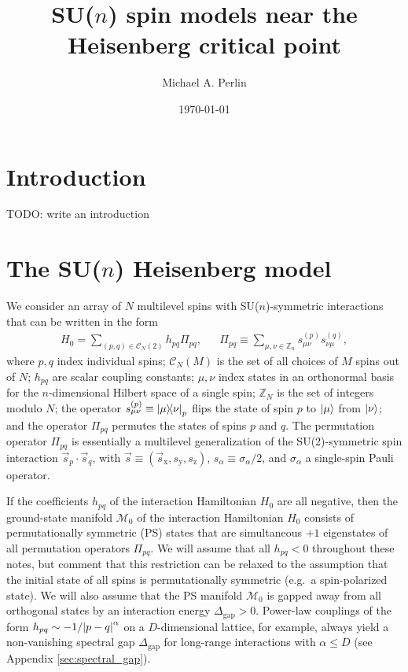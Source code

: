 \documentclass[nofootinbib,notitlepage,11pt]{revtex4-2}
\renewcommand{\t}{\text} %
\newcommand{\p}[1]{\left(#1\right)} %
\renewcommand{\c}{\cdot} %
\renewcommand{\v}{\vec} %
\newcommand{\1}{\mathds{1}}
\newcommand{\x}{\text{x}}
\newcommand{\y}{\text{y}}
\newcommand{\z}{\text{z}}
\newcommand{\C}{\mathcal{C}}
\newcommand{\M}{\mathcal{M}}
\newcommand{\ZZ}{\mathbb{Z}}
\newcommand{\red}[1]{{\color{red} #1}}
\begin{document}
\title{SU($n$) spin models near the Heisenberg critical point}%
\author{Michael A. Perlin}%
\date{\today}

\maketitle

\tableofcontents

\section{Introduction}

\red{TODO: write an introduction}

\section{The SU($n$) Heisenberg model}

We consider an array of $N$ multilevel spins with SU($n$)-symmetric
interactions that can be written in the form
\begin{align}
  H_0 = \sum_{\p{p,q}\in\C_N\p{2}} h_{pq} \Pi_{pq},
  &&
  \Pi_{pq} \equiv \sum_{\mu,\nu\in\ZZ_n} s_{\mu\nu}^{(p)} s_{\nu\mu}^{(q)},
  \label{eq:H_0}
\end{align}
where $p,q$ index individual spins; $\C_N\p{M}$ is the set of all
choices of $M$ spins out of $N$; $h_{pq}$ are scalar coupling
constants; $\mu,\nu$ index states in an orthonormal basis for the
$n$-dimensional Hilbert space of a single spin; $\ZZ_N$ is the set of
integers modulo $N$; the operator
$s_{\mu\nu}^{(p)}\equiv\op{\mu}{\nu}_p$ flips the state of spin $p$ to
$\ket\mu$ from $\ket\nu$; and the operator $\Pi_{pq}$ permutes the
states of spins $p$ and $q$.  The permutation operator $\Pi_{pq}$ is
essentially a multilevel generalization of the SU(2)-symmetric spin
interaction $\v s_p\c\v s_q$, with $\v s\equiv\p{\v s_\x,s_\y,s_\z}$,
$s_\alpha\equiv\sigma_\alpha/2$, and $\sigma_\alpha$ a single-spin
Pauli operator.

If the coefficients $h_{pq}$ of the interaction Hamiltonian $H_0$ are
all negative, then the ground-state manifold $\M_0$ of the interaction
Hamiltonian $H_0$ consists of permutationally symmetric (PS) states
that are simultaneous $+1$ eigenstates of all permutation operators
$\Pi_{pq}$.  We will assume that all $h_{pq}<0$ throughout these
notes, but comment that this restriction can be relaxed to the
assumption that the initial state of all spins is permutationally
symmetric (e.g.~a spin-polarized state).  We will also assume that the
PS manifold $\M_0$ is gapped away from all orthogonal states by an
interaction energy $\Delta_{\t{gap}}>0$.  Power-law couplings of the
form $h_{pq}\sim-1/\abs{p-q}^\alpha$ on a $D$-dimensional lattice, for
example, always yield a non-vanishing spectral gap $\Delta_{\t{gap}}$
for long-range interactions with $\alpha\le D$ (see Appendix
\ref{sec:spectral_gap}).
\end{document}
